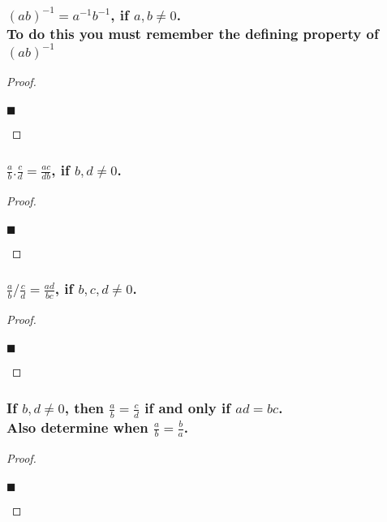 \documentclass[letterpaper, 10 pt, conference]{ieeeconf}  %
\begin{document}
\subsubsection{\textbf{$(ab)^{-1} = a^{-1}b^{-1}$, if $a, b \neq 0$. \\ \small{To do this you must remember the defining property of $(ab)^{-1}$}}}
\begin{proof}
\begin{align}
    
\end{align}
\begin{flushright}
$\blacksquare$
\end{flushright}
\end{proof}

\subsubsection{\textbf{$\frac{a}{b} . \frac{c}{d} = \frac{ac}{db}$, if $b, d \neq 0$.}}
\begin{proof}
\begin{align}
    
\end{align}
\begin{flushright}
$\blacksquare$
\end{flushright}
\end{proof}

\subsubsection{\textbf{$\frac{a}{b} / \frac{c}{d} = \frac{ad}{bc}$, if $b, c, d \neq 0$.}}
\begin{proof}
\begin{align}
    
\end{align}
\begin{flushright}
$\blacksquare$
\end{flushright}
\end{proof}

\subsubsection{\textbf{If $b, d \neq 0$, then $\frac{a}{b} = \frac{c}{d}$ if and only if $ad = bc$. \\ Also determine when $\frac{a}{b} = \frac{b}{a}$.}}
\begin{proof}
\begin{align}
    
\end{align}
\begin{flushright}
$\blacksquare$
\end{flushright}
\end{proof}
\end{document}
